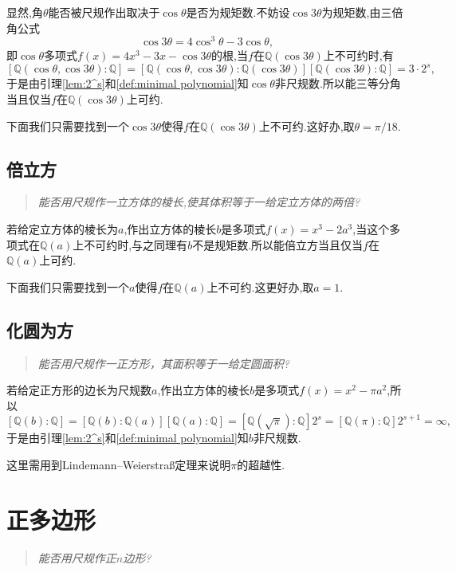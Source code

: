 显然,角$\theta$能否被尺规作出取决于$\cos \theta$是否为规矩数.不妨设$\cos3\theta$为规矩数,由三倍角公式
\[
\cos 3\theta=4\cos^3\theta-3\cos\theta,
\]
即$\cos\theta$多项式$f(x)=4x^3-3x-\cos3\theta$的根,当$f$在$\mathbb{Q}(\cos3\theta)$上不可约时,有
\[
[\mathbb{Q}(\cos\theta,\cos3\theta):\mathbb{Q}]=[\mathbb{Q}(\cos\theta,\cos3\theta):\mathbb{Q}(\cos3\theta)][\mathbb{Q}(\cos3\theta):\mathbb{Q}]=3\cdot2^s,
\]
于是由引理\ref{lem:2^s}和\ref{def:minimal polynomial}知$\cos\theta$非尺规数.所以能三等分角当且仅当$f$在$\mathbb{Q}(\cos3\theta)$上可约.

下面我们只需要找到一个$\cos3\theta$使得$f$在$\mathbb{Q}(\cos3\theta)$上不可约.这好办,取$\theta=\pi/18$.
\subsection{倍立方}
\begin{quotation}
	\textit{能否用尺规作一立方体的棱长,使其体积等于一给定立方体的两倍?}
\end{quotation}

若给定立方体的棱长为$a$,作出立方体的棱长$b$是多项式$f(x)=x^3-2a^3$,当这个多项式在$\mathbb{Q}(a)$上不可约时,与之同理有$b$不是规矩数.所以能倍立方当且仅当$f$在$\mathbb{Q}(a)$上可约.

下面我们只需要找到一个$a$使得$f$在$\mathbb{Q}(a)$上不可约.这更好办,取$a=1$.
\subsection{化圆为方}
\begin{quotation}
	\textit{能否用尺规作一正方形，其面积等于一给定圆面积?}
\end{quotation}

若给定正方形的边长为尺规数$a$,作出立方体的棱长$b$是多项式$f(x)=x^2-\pi a^2$,所以
\[
[\mathbb{Q}(b):\mathbb{Q}]=[\mathbb{Q}(b):\mathbb{Q}(a)][\mathbb{Q}(a):\mathbb{Q}]=[\mathbb{Q}(\sqrt{\pi}):\mathbb{Q}]2^s=[\mathbb{Q}(\pi):\mathbb{Q}]2^{s+1}=\infty,
\]
于是由引理\ref{lem:2^s}和\ref{def:minimal polynomial}知$b$非尺规数.

\begin{remark}
	这里需用到Lindemann–Weierstraß定理来说明$\pi$的超越性.
\end{remark}
\section{正多边形}
\begin{quotation}
	\textit{能否用尺规作正$n$边形?}
\end{quotation}

